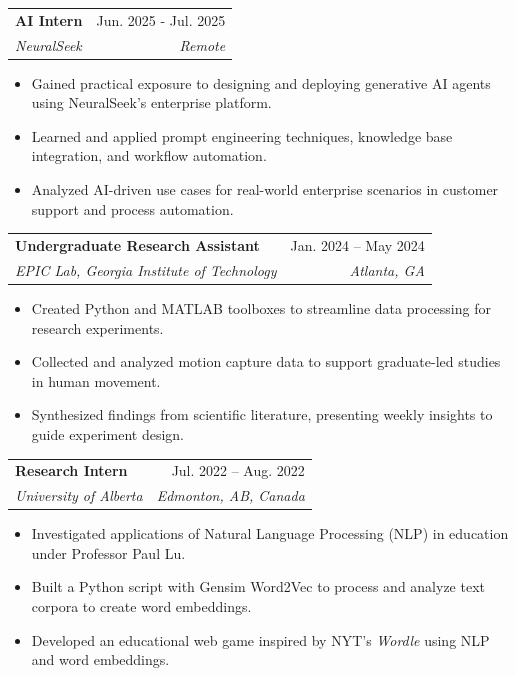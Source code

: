 \documentclass[letterpaper,11pt]{article}
\makeatletter
\newcommand{\resumeItem}[1]{
  \item\small{
    {#1 \vspace{-2pt}}
  }
}
\newcommand{\resumeSubheading}[4]{
  \vspace{-2pt}\item
    \begin{tabular*}{0.97\textwidth}[t]{l@{\extracolsep{\fill}}r}
      \textbf{\small#1} & \small #2 \\
      \textit{\small#3} & \textit{\small #4} \\
    \end{tabular*}\vspace{-5pt}
}
\newcommand{\resumeSubSubheading}[2]{
    \item
    \begin{tabular*}{0.97\textwidth}{l@{\extracolsep{\fill}}r}
      \textit{\small#1} & \textit{\small #2} \\
    \end{tabular*}\vspace{-5pt}
}
\newcommand{\resumeSubHeadingListEnd}{\end{itemize}}
\newcommand{\resumeItemListStart}{\begin{itemize}}
\newcommand{\resumeItemListEnd}{\end{itemize}\vspace{-5pt}}
\makeatother
\begin{document}
      \resumeSubheading
      {AI Intern}{Jun. 2025 - Jul. 2025}
      {NeuralSeek}{Remote}
      \resumeItemListStart
        \resumeItem{Gained practical exposure to designing and deploying generative AI agents using NeuralSeek’s enterprise platform.}
        \resumeItem{Learned and applied prompt engineering techniques, knowledge base integration, and workflow automation.}
        \resumeItem{Analyzed AI-driven use cases for real-world enterprise scenarios in customer support and process automation.}
      \resumeItemListEnd
      

    \resumeSubheading
      {Undergraduate Research Assistant}{Jan. 2024 -- May 2024}
      {EPIC Lab, Georgia Institute of Technology}{Atlanta, GA}
      \resumeItemListStart
        \resumeItem{Created Python and MATLAB toolboxes to streamline data processing for research experiments.}
        \resumeItem{Collected and analyzed motion capture data to support graduate-led studies in human movement.}
        \resumeItem{Synthesized findings from scientific literature, presenting weekly insights to guide experiment design.}
    \resumeItemListEnd

    \resumeSubheading
      {Research Intern}{Jul. 2022 -- Aug. 2022}
      {University of Alberta}{Edmonton, AB, Canada}
      \resumeItemListStart
        \resumeItem{Investigated applications of Natural Language Processing (NLP) in education under Professor Paul Lu.}
        \resumeItem{Built a Python script with Gensim Word2Vec to process and analyze text corpora to create word embeddings.}
        \resumeItem{Developed an educational web game inspired by NYT's \emph{Wordle} using NLP and word embeddings.}
      \resumeItemListEnd
\end{document}
